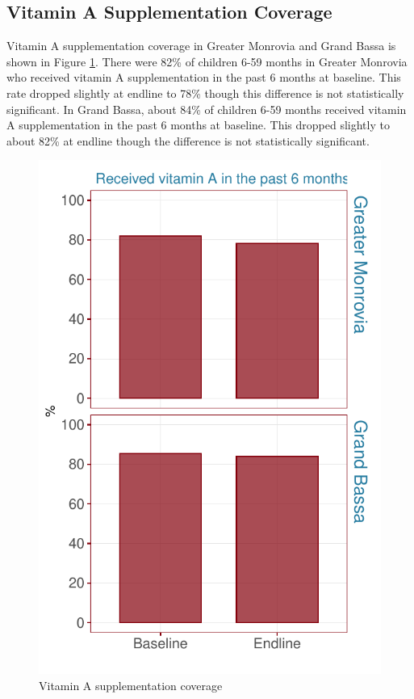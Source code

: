 \documentclass[12pt,a4paper]{article}
\begin{document}
\hypertarget{vitamin-a-supplementation-coverage}{%
\subsection{Vitamin A Supplementation Coverage}\label{vitamin-a-supplementation-coverage}}

Vitamin A supplementation coverage in Greater Monrovia and Grand Bassa is shown in Figure \ref{fig:vit1plot}. There were 82\% of children 6-59 months in Greater Monrovia who received vitamin A supplementation in the past 6 months at baseline. This rate dropped slightly at endline to 78\% though this difference is not statistically significant. In Grand Bassa, about 84\% of children 6-59 months received vitamin A supplementation in the past 6 months at baseline. This dropped slightly to about 82\% at endline though the difference is not statistically significant.

\begin{figure}[H]

{\centering \includegraphics{liberiaCoverageFinalReport_files/figure-latex/vit1plot-1} 

}

\caption{Vitamin A supplementation coverage}\label{fig:vit1plot}
\end{figure}
\end{document}
